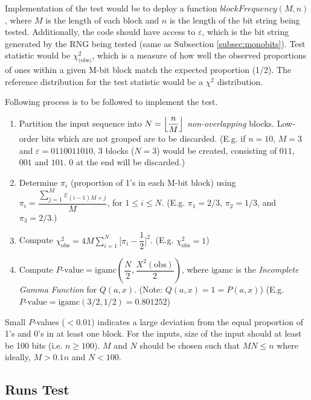 Implementation of the test would be to deploy a function $blockFrequency(M,n)$, where $M$ is the length of each block and $n$ is the length of the bit string being tested. Additionally, the code should have access to $\varepsilon$, which is the bit string generated by the RNG being tested (same as Subsection \ref{subsec:monobits}). Test statistic would be $\chi^2_\text{(obs)}$, which is a measure of how well the observed proportions of ones within a given M-bit block match the expected proportion (1/2). The reference distribution for the test statistic would be a $\chi^2$ distribution\cite{rep_nist_sp_80022}.

Following process is to be followed to implement the test.

\begin{enumerate}
    \item Partition the input sequence into $N = \floor*{\dfrac{n}{M}}$ \textit{non-overlapping} blocks. Low-order bits which are not grouped are to be discarded. (E.g. if $n = 10$, $M = 3$ and $\varepsilon = 0110011010$, 3 blocks ($N = 3$) would be created, consisting of $011$, $001$ and $101$. $0$ at the end will be discarded.)
    
    \item Determine $\pi_i$ (proportion of 1's in each M-bit block) using $\pi_i = \dfrac{\sum_{j=1}^{M}\varepsilon_{(i-1)M+j}}{M}$, for $1 \le i \le N$. (E.g. $\pi_1 = 2/3$, $\pi_2 = 1/3$, and $\pi_3 = 2/3$.)
    
    \item Compute $\chi^2_{\text{obs}} = 4M\sum_{i=1}^{N}\bigg[ \pi_i - \dfrac{1}{2}\bigg]^2$. (E.g. $\chi^2_{\text{obs}} = 1$)
    
    \item Compute $P\text{-value}  = \text{igamc}(\dfrac{N}{2}, \dfrac{X^2(\text{obs})}{2})$, where $\text{igamc}$ is the \textit{Incomplete Gamma Function} for $Q(a,x)$. (Note: $Q(a,x) = 1 = P(a,x)$) (E.g. $P\text{-value} = \text{igamc}(3/2, 1/2) = 0.801252$)
\end{enumerate}

Small $P$-values ($< 0.01$) indicates a large deviation from the equal proportion of 1's and 0's in at least one block. For the inputs, size of the input should at least be 100 bits (i.e. $n \ge 100$). $M$ and $N$ should be chosen such that $MN \le n$ where ideally, $M > 0.1n$ and $N < 100$.

\subsection{Runs Test}

